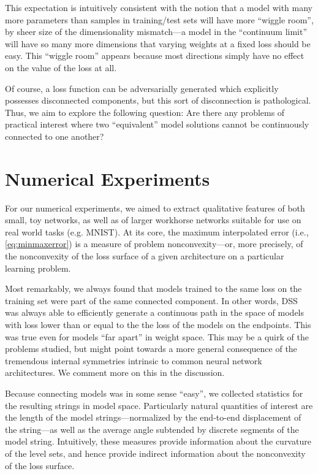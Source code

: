 \documentclass[twocolumn,superscriptaddress,aps,prb,floatfix]{revtex4-1}
\begin{document}
This expectation is intuitively consistent with the notion that a model with many more parameters than samples in training/test sets will have more ``wiggle room'', by sheer size of the dimensionality mismatch---a model in the ``continuum limit'' will have so many more dimensions that varying weights at a fixed loss should be easy.  This ``wiggle room'' appears because most directions simply have no effect on the value of the loss at all.

Of course, a loss function can be adversarially generated which explicitly possesses disconnected components, but this sort of disconnection is pathological.  Thus, we aim to explore the following question: Are there any problems of practical interest where two ``equivalent'' model solutions cannot be continuously connected to one another?


 
 
\section{Numerical Experiments}
\label{sec:NumExp}

For our numerical experiments, we aimed to extract qualitative features of both small, toy networks, as well as of larger workhorse networks suitable for use on real world tasks (e.g. MNIST).  At its core, the maximum interpolated error (i.e., \eqref{eq:minmaxerror}) is a measure of problem nonconvexity---or, more precisely, of the nonconvexity of the loss surface of a given architecture on a particular learning problem.

Most remarkably, we always found that models trained to the same loss on the training set were part of the same connected component.  In other words, DSS was always able to efficiently generate a continuous path in the space of models with loss lower than or equal to the the loss of the models on the endpoints.  This was true even for models ``far apart'' in weight space.  This may be a quirk of the problems studied, but might point towards a more general consequence of the tremendous internal symmetries intrinsic to common neural network architectures.  We comment more on this in the discussion.

Because connecting models was in some sense ``easy'', we collected statistics for the resulting strings in model space.  Particularly natural quantities of interest are the length of the model strings---normalized by the end-to-end displacement of the string---as well as the average angle subtended by discrete segments of the model string.  Intuitively, these measures provide information about the curvature of the level sets, and hence provide indirect information about the nonconvexity of the loss surface.
\end{document}
